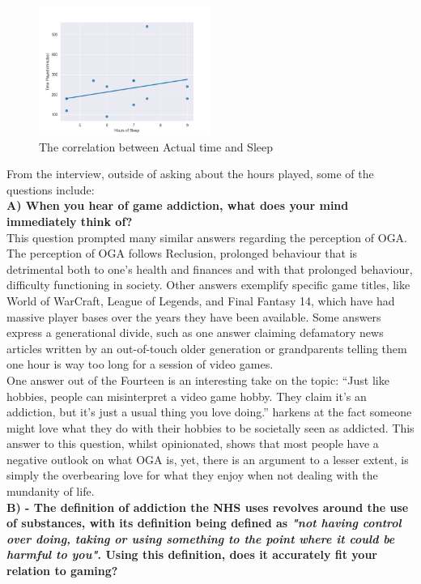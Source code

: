 \documentclass[conference]{IEEEtran}
\begin{document}
\begin{figure}[H]
\includegraphics[width = 0.5\textwidth]{Graph3}
\caption{The correlation between Actual time and Sleep}
\label{tab:figure8}
\end{figure}


From the interview, outside of asking about the hours played, some of the questions include:\\

 \textbf{A) When you hear of game addiction, what does your mind immediately think of?}\\

This question prompted many similar answers regarding the perception of OGA. The perception of OGA follows Reclusion, prolonged behaviour that is detrimental both to one’s health and finances and with that prolonged behaviour, difficulty functioning in society. Other answers exemplify specific game titles, like World of WarCraft\cite{Entertainment2004}, League of Legends\cite{Games2009}, and Final Fantasy 14\cite{Enix2013 }, which have had massive player bases over the years they have been available. Some answers express a generational divide, such as one answer claiming defamatory news articles written by an out-of-touch older generation or grandparents telling them one hour is way too long for a session of video games.\\

One answer out of the Fourteen is an interesting take on the topic: “Just like hobbies, people can misinterpret a video game hobby. They claim it’s an addiction, but it’s just a usual thing you love doing.” harkens at the fact someone might love what they do with their hobbies to be societally seen as addicted. This answer to this question, whilst opinionated, shows that most people have a negative outlook on what OGA is, yet, there is an argument to a lesser extent, is simply the overbearing love for what they enjoy when not dealing with the mundanity of life.\\

 \textbf{B) - The definition of addiction the NHS uses revolves around the use of substances, with its definition being defined as \textit{"not having control over doing, taking or using something to the point where it could be harmful to you"}. Using this definition, does it accurately fit your relation to gaming?}\\
\end{document}

